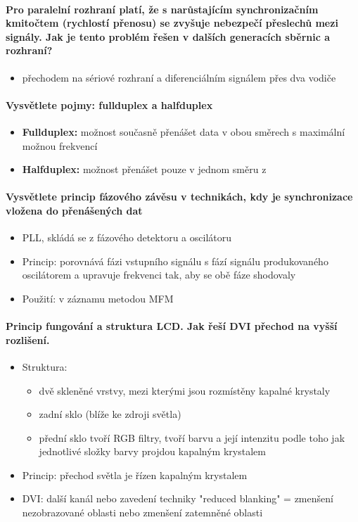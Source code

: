 \documentclass[a5paper,10pt]{article}
\begin{document}
\paragraph{Pro paralelní rozhraní platí, že s narůstajícím synchronizačním kmitočtem (rychlostí přenosu) se zvyšuje nebezpečí přeslechů mezi signály. Jak je tento problém řešen v dalších generacích sběrnic a rozhraní?}
\begin{itemize}
	\item přechodem na sériové rozhraní a diferenciálním signálem přes dva vodiče
\end{itemize}

\paragraph{Vysvětlete pojmy: fullduplex a halfduplex}
\begin{itemize}
	\item \textbf{Fullduplex:} možnost současně přenášet data v obou směrech s maximální možnou frekvencí
	\item \textbf{Halfduplex:} možnost přenášet pouze v jednom směru z
\end{itemize}

\paragraph{Vysvětlete princip fázového závěsu v technikách, kdy je synchronizace vložena do přenášených dat}
\begin{itemize}
	\item PLL, skládá se z fázového detektoru a oscilátoru
	\item Princip: porovnává fázi vstupního signálu s fází signálu produkovaného oscilátorem a upravuje frekvenci tak, aby se obě fáze shodovaly
	\item Použití: v záznamu metodou MFM
\end{itemize}

\paragraph{Princip fungování a struktura LCD. Jak řeší DVI přechod na vyšší rozlišení.}
\begin{itemize}
	\item Struktura:
	\begin{itemize}
		\item dvě skleněné vrstvy, mezi kterými jsou rozmístěny kapalné krystaly
		\item zadní sklo (blíže ke zdroji světla)
		\item přední sklo tvoří RGB filtry, tvoří barvu a její intenzitu podle toho jak jednotlivé složky barvy projdou kapalným krystalem
	\end{itemize}
	\item Princip: přechod světla je řízen kapalným krystalem
	\item DVI: další kanál nebo zavedení techniky "reduced blanking" = zmenšení nezobrazované oblasti nebo zmenšení zatemněné oblasti
\end{itemize}
\end{document}
